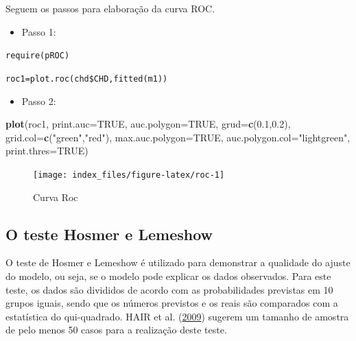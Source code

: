 \documentclass[12pt,brazil,oneside]{book}
\newenvironment{Shaded}{\begin{snugshade}}{\end{snugshade}}
\newcommand{\DataTypeTok}[1]{\textcolor[rgb]{0.13,0.29,0.53}{#1}}
\newcommand{\FloatTok}[1]{\textcolor[rgb]{0.00,0.00,0.81}{#1}}
\newcommand{\KeywordTok}[1]{\textcolor[rgb]{0.13,0.29,0.53}{\textbf{#1}}}
\newcommand{\NormalTok}[1]{#1}
\newcommand{\OtherTok}[1]{\textcolor[rgb]{0.56,0.35,0.01}{#1}}
\newcommand{\StringTok}[1]{\textcolor[rgb]{0.31,0.60,0.02}{#1}}
\providecommand{\tightlist}{%
  \setlength{\itemsep}{0pt}\setlength{\parskip}{0pt}}
\begin{document}
Seguem os passos para elaboração da curva ROC.

\begin{itemize}
\tightlist
\item
  Passo 1:
\end{itemize}

\texttt{require(pROC)}

\texttt{roc1=plot.roc(chd\$CHD,fitted(m1))}

\begin{itemize}
\tightlist
\item
  Passo 2:
\end{itemize}

\begin{Shaded}
\begin{Highlighting}[]
\KeywordTok{plot}\NormalTok{(roc1,}
     \DataTypeTok{print.auc=}\OtherTok{TRUE}\NormalTok{, }
     \DataTypeTok{auc.polygon=}\OtherTok{TRUE}\NormalTok{, }
     \DataTypeTok{grud=}\KeywordTok{c}\NormalTok{(}\FloatTok{0.1}\NormalTok{,}\FloatTok{0.2}\NormalTok{),}
     \DataTypeTok{grid.col=}\KeywordTok{c}\NormalTok{(}\StringTok{"green"}\NormalTok{,}\StringTok{"red"}\NormalTok{), }
     \DataTypeTok{max.auc.polygon=}\OtherTok{TRUE}\NormalTok{, }
     \DataTypeTok{auc.polygon.col=}\StringTok{"lightgreen"}\NormalTok{, }
     \DataTypeTok{print.thres=}\OtherTok{TRUE}\NormalTok{)}
\end{Highlighting}
\end{Shaded}

\begin{figure}[H]

{\centering \texttt{[image: index\_files/figure-latex/roc-1]} 

}

\caption{Curva Roc}\label{fig:roc}
\end{figure}

\hypertarget{o-teste-hosmer-e-lemeshow}{%
\subsection{O teste Hosmer e Lemeshow}\label{o-teste-hosmer-e-lemeshow}}

O teste de Hosmer e Lemeshow é utilizado para demonstrar a qualidade do ajuste do modelo, ou seja, se o modelo pode explicar os dados observados. Para este teste, os dados são divididos de acordo com as probabilidades previstas em 10 grupos iguais, sendo que os números previstos e os reais são comparados com a estatística do qui-quadrado. HAIR et al. (\protect\hyperlink{ref-Hair2009}{2009}) sugerem um tamanho de amostra de pelo menos 50 casos para a realização deste teste.
\end{document}
